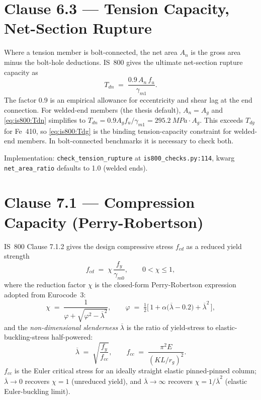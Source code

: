 \section{Clause 6.3 --- Tension Capacity, Net-Section Rupture}
\label{app:is800:clause6_3}

Where a tension member is bolt-connected, the net area $A_n$ is
the gross area minus the bolt-hole deductions. IS~800 gives the
ultimate net-section rupture capacity as
\begin{equation}
  T_{dn} \;=\; \frac{0.9\,A_n\,f_u}{\gamma_{m1}}.
  \label{eq:is800:Tdn}
\end{equation}
The factor \num{0.9} is an empirical allowance for eccentricity
and shear lag at the end connection. For welded-end members
(the thesis default), $A_n = A_g$ and
\cref{eq:is800:Tdn} simplifies to
$T_{dn}=0.9 A_g f_u/\gamma_{m1}=\SI{295.2}{MPa}\cdot A_g$. This
exceeds $T_{dg}$ for Fe~410, so \cref{eq:is800:Tdg} is the
binding tension-capacity constraint for welded-end members. In
bolt-connected benchmarks it is necessary to check both.

Implementation: \texttt{check\_tension\_rupture} at
\texttt{is800\_checks.py:114}, kwarg
\texttt{net\_area\_ratio} defaults to \num{1.0} (welded ends).

\section{Clause 7.1 --- Compression Capacity (Perry-Robertson)}
\label{app:is800:clause7_1}

IS~800 Clause 7.1.2 gives the design compressive stress
$f_{cd}$ as a reduced yield strength
\begin{equation}
  f_{cd} \;=\; \chi\,\frac{f_y}{\gamma_{m0}},
  \qquad 0<\chi\le 1,
  \label{eq:is800:fcd}
\end{equation}
where the reduction factor $\chi$ is the closed-form
Perry-Robertson expression adopted from Eurocode~3:
\begin{equation}
  \chi \;=\; \frac{1}{\varphi + \sqrt{\varphi^2-\overline{\lambda}^2}},
  \qquad
  \varphi \;=\;
    \tfrac{1}{2}\bigl[\,
      1 + \alpha\bigl(\overline{\lambda}-\num{0.2}\bigr)
        + \overline{\lambda}^{2}
    \,\bigr],
  \label{eq:is800:chi}
\end{equation}
and the \emph{non-dimensional slenderness} $\overline{\lambda}$ is
the ratio of yield-stress to elastic-buckling-stress half-powered:
\begin{equation}
  \overline{\lambda}
  \;=\;\sqrt{\frac{f_y}{f_{cc}}},
  \qquad
  f_{cc} \;=\;\frac{\pi^2 E}{(KL/r_g)^2}.
  \label{eq:is800:lambda_bar}
\end{equation}
$f_{cc}$ is the Euler critical stress for an ideally straight
elastic pinned-pinned column; $\overline{\lambda}\to 0$ recovers
$\chi=1$ (unreduced yield), and $\overline{\lambda}\to\infty$
recovers $\chi=1/\overline{\lambda}^2$ (elastic Euler-buckling
limit).


